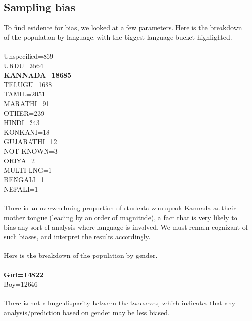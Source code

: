 \documentclass[10pt]{article}
\begin{document}
\subsection{Sampling bias}
To find evidence for bias, we looked at a few parameters.
Here is the breakdown of the population by language, with the biggest language bucket highlighted.\\\\
Unspecified=869\\
URDU=3564\\
\textbf{KANNADA=18685}\\
TELUGU=1688\\
TAMIL=2051\\
MARATHI=91\\
OTHER=239\\
HINDI=243\\
KONKANI=18\\
GUJARATHI=12\\
NOT KNOWN=3\\
ORIYA=2\\
MULTI LNG=1\\
BENGALI=1\\
NEPALI=1\\
\\
There is an overwhelming proportion of students who speak Kannada as their mother tongue (leading by an order of magnitude), a fact that is very likely to bias any sort of analysis where language is involved. We must remain cognizant of such biases, and interpret the results accordingly.\\\\
Here is the breakdown of the population by gender.\\\\
\textbf{Girl=14822}\\
Boy=12646\\\\
There is not a huge disparity between the two sexes, which indicates that any analysis/prediction based on gender may be less biased.

\newpage
\end{document}
